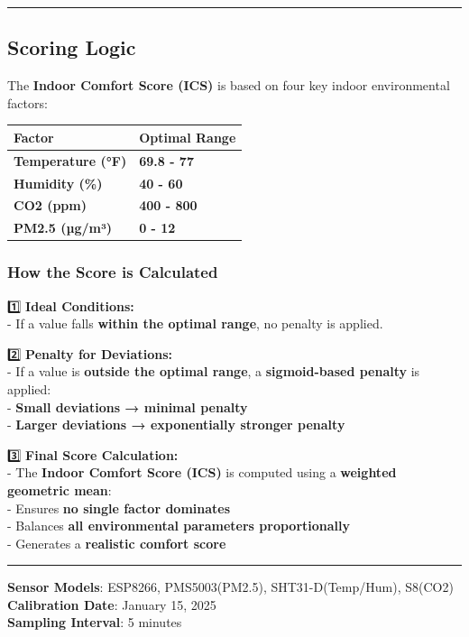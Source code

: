\documentclass[
  12pt,
  letterpaper,
]{article}
\begin{document}
\begin{center}\rule{0.5\linewidth}{0.5pt}\end{center}

\subsection{\texorpdfstring{\textbf{Scoring
Logic}}{Scoring Logic}}\label{scoring-logic}

The \textbf{Indoor Comfort Score (ICS)} is based on four key indoor
environmental factors:

\begin{longtable}[]{@{}ll@{}}
\toprule\noalign{}
\textbf{Factor} & \textbf{Optimal Range} \\
\midrule\noalign{}
\endhead
\bottomrule\noalign{}
\endlastfoot
\textbf{Temperature (°F)} & \textbf{69.8 - 77} \\
\textbf{Humidity (\%)} & \textbf{40 - 60} \\
\textbf{CO2 (ppm)} & \textbf{400 - 800} \\
\textbf{PM2.5 (µg/m³)} & \textbf{0 - 12} \\
\end{longtable}

\subsubsection{\texorpdfstring{\textbf{How the Score is
Calculated}}{How the Score is Calculated}}\label{how-the-score-is-calculated}

1️⃣ \textbf{Ideal Conditions:}\\
- If a value falls \textbf{within the optimal range}, no penalty is
applied.

2️⃣ \textbf{Penalty for Deviations:}\\
- If a value is \textbf{outside the optimal range}, a
\textbf{sigmoid-based penalty} is applied:\\
- \textbf{Small deviations → minimal penalty}\\
- \textbf{Larger deviations → exponentially stronger penalty}

3️⃣ \textbf{Final Score Calculation:}\\
- The \textbf{Indoor Comfort Score (ICS)} is computed using a
\textbf{weighted geometric mean}:\\
- Ensures \textbf{no single factor dominates}\\
- Balances \textbf{all environmental parameters proportionally}\\
- Generates a \textbf{realistic comfort score}

\begin{center}\rule{0.5\linewidth}{0.5pt}\end{center}

\textbf{Sensor Models}: ESP8266, PMS5003(PM2.5), SHT31-D(Temp/Hum),
S8(CO2)\\
\textbf{Calibration Date}: January 15, 2025\\
\textbf{Sampling Interval}: 5 minutes
\end{document}
